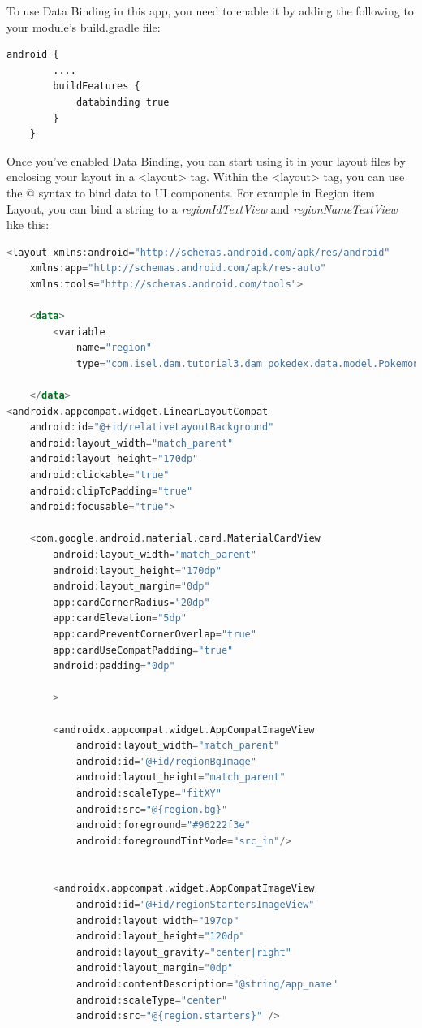 \documentclass[a4paper, 12pt]{article}
\begin{document}
To use Data Binding in this app, you need to enable it by adding the following to your module's build.gradle file:


\begin{lstlisting}[caption={Navigation with Region Fragment.}, label={code:nav_region_code}, language=XML]
    android {
		....
		buildFeatures {
			databinding true
		}
	}
\end{lstlisting}

Once you've enabled Data Binding, you can start using it in your layout files by enclosing
your layout in a <layout> tag. 
Within the <layout> tag, you can use the @{} syntax to bind data to UI components. 
For example in Region item Layout, you can bind a string to a \textit{regionIdTextView} and \textit{regionNameTextView} like this:


\begin{lstlisting}[caption={Navigation with Region Fragment.}, label={code:nav_region_code}, language=Kotlin]
    <layout xmlns:android="http://schemas.android.com/apk/res/android"
    xmlns:app="http://schemas.android.com/apk/res-auto"
    xmlns:tools="http://schemas.android.com/tools">

    <data>
        <variable
            name="region"
            type="com.isel.dam.tutorial3.dam_pokedex.data.model.PokemonRegion" />

    </data>
<androidx.appcompat.widget.LinearLayoutCompat
    android:id="@+id/relativeLayoutBackground"
    android:layout_width="match_parent"
    android:layout_height="170dp"
    android:clickable="true"
    android:clipToPadding="true"
    android:focusable="true">

    <com.google.android.material.card.MaterialCardView
        android:layout_width="match_parent"
        android:layout_height="170dp"
        android:layout_margin="0dp"
        app:cardCornerRadius="20dp"
        app:cardElevation="5dp"
        app:cardPreventCornerOverlap="true"
        app:cardUseCompatPadding="true"
        android:padding="0dp"

        >

        <androidx.appcompat.widget.AppCompatImageView
            android:layout_width="match_parent"
            android:id="@+id/regionBgImage"
            android:layout_height="match_parent"
            android:scaleType="fitXY"
            android:src="@{region.bg}"
            android:foreground="#96222f3e"
            android:foregroundTintMode="src_in"/>


        <androidx.appcompat.widget.AppCompatImageView
            android:id="@+id/regionStartersImageView"
            android:layout_width="197dp"
            android:layout_height="120dp"
            android:layout_gravity="center|right"
            android:layout_margin="0dp"
            android:contentDescription="@string/app_name"
            android:scaleType="center"
            android:src="@{region.starters}" />


\end{lstlisting}
\end{document}
